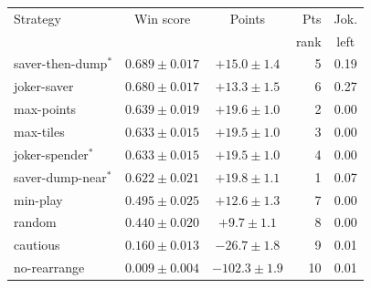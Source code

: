 \begin{tabular}{@{}lccrc@{}}\toprule
Strategy & Win score & Points & Pts & Jok.\\
 & & & rank & left\\\midrule
saver-then-dump$^*$ & $0.689\pm0.017$ & $+15.0\pm1.4$ & 5 & 0.19\\
joker-saver & $0.680\pm0.017$ & $+13.3\pm1.5$ & 6 & 0.27\\
max-points & $0.639\pm0.019$ & $+19.6\pm1.0$ & 2 & 0.00\\
max-tiles & $0.633\pm0.015$ & $+19.5\pm1.0$ & 3 & 0.00\\
joker-spender$^*$ & $0.633\pm0.015$ & $+19.5\pm1.0$ & 4 & 0.00\\
saver-dump-near$^*$ & $0.622\pm0.021$ & $+19.8\pm1.1$ & 1 & 0.07\\
min-play & $0.495\pm0.025$ & $+12.6\pm1.3$ & 7 & 0.00\\
random & $0.440\pm0.020$ & $+9.7\pm1.1$ & 8 & 0.00\\
cautious & $0.160\pm0.013$ & $-26.7\pm1.8$ & 9 & 0.01\\
no-rearrange & $0.009\pm0.004$ & $-102.3\pm1.9$ & 10 & 0.01\\
\bottomrule
\end{tabular}

